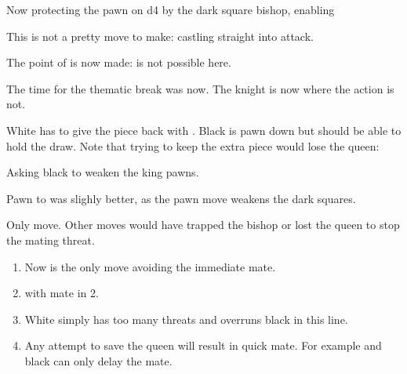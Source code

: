 
Now protecting the pawn on d4 by the dark square bishop,
enabling 


This is not a pretty move to make: castling straight into attack.


The point of  is now made:  is not possible here.


The time for the thematic  break was now. The knight is now
where the action is not.

 White has to give the
piece back with . Black is pawn down but
should be able to hold the draw. Note that trying to keep the extra
piece would lose the queen: 


Asking black to weaken the king pawns.


Pawn to  was slighly better, as the pawn move 
weakens the dark squares.


Only move. Other moves would have trapped the bishop or lost the queen
to stop the mating threat.

\begin{enumerate}[label=(\alph*)]
\item {}
Now  is the only move avoiding the immediate mate.
\item {} with
mate in 2.
\item {} White simply has too many threats
and overruns black in this line.
\item {} Any attempt to save the queen will result in quick mate. For
example  and black can only delay the
mate.
\end{enumerate}

